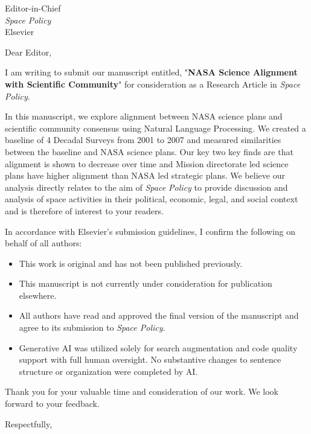 \documentclass[11pt]{letter}
\begin{document}
\begin{letter}{
    Editor-in-Chief \\
    \textit{Space Policy} \\
    Elsevier
}

\opening{Dear Editor,}

I am writing to submit our manuscript entitled, "\textbf{NASA Science Alignment with Scientific Community}" for consideration as a Research Article in \textit{Space Policy}.

In this manuscript, we explore alignment between NASA science plans and scientific community consensus using Natural Language Processing. We created a baseline of 4 Decadal Surveys from 2001 to 2007 and measured similarities between the baseline and NASA science plans. Our key two key finds are that alignment is shown to decrease over time and Mission directorate led science plans have higher alignment than NASA led strategic plans. We believe our analysis directly relates to the aim of \textit{Space Policy} to provide discussion and analysis of space activities in their political, economic, legal, and social context and is therefore of interest to your readers.

In accordance with Elsevier's submission guidelines, I confirm the following on behalf of all authors:
\begin{itemize}
    \item This work is original and has not been published previously.
    \item This manuscript is not currently under consideration for publication elsewhere.
    \item All authors have read and approved the final version of the manuscript and agree to its submission to \textit{Space Policy}.
    \item Generative AI was utilized solely for search augmentation and code quality support with full human oversight. No substantive changes to sentence structure or organization were completed by AI. 
\end{itemize}

Thank you for your valuable time and consideration of our work. We look forward to your feedback.

\closing{Respectfully,}

\end{letter}
\end{document}
